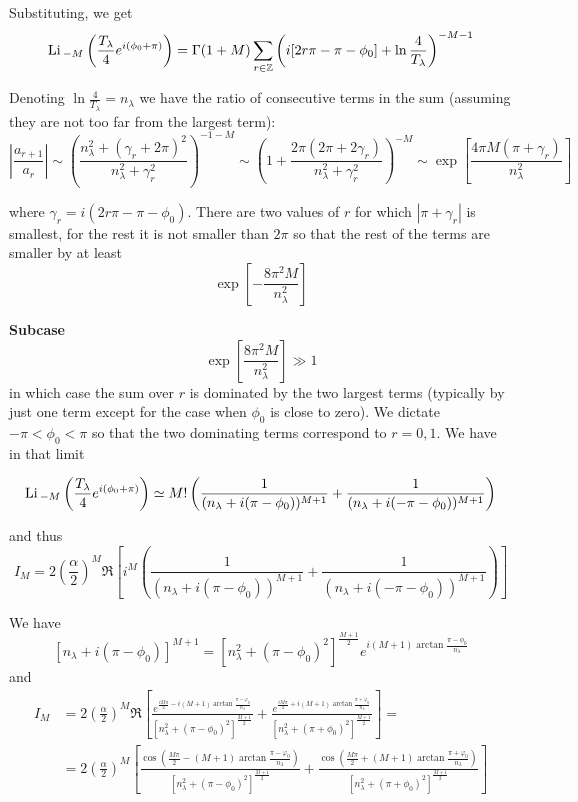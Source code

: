 Substituting, we get
\[
\mathrm{Li}\,_{-M}\left(\frac{T_{\lambda}}{4}e^{i(\phi_{0}+\pi)}\right)=\Gamma(1+M)\sum_{r\in\mathbb{Z}}\left(i[2r\pi-\pi-\phi_{0}]+\ln\frac{4}{T_{\lambda}}\right)^{-M-1}
\]

Denoting $\ln\frac{4}{T_{\lambda}}=n_{\lambda}$ we have the ratio
of consecutive terms in the sum (assuming they are not too far from
the largest term):
\[
\left|\frac{a_{r+1}}{a_{r}}\right|\sim\left(\frac{n_{\lambda}^{2}+(\gamma_{r}+2\pi)^{2}}{n_{\lambda}^{2}+\gamma_{r}^{2}}\right)^{-1-M}\sim\left(1+\frac{2\pi(2\pi+2\gamma_{r})}{n_{\lambda}^{2}+\gamma_{r}^{2}}\right)^{-M}\sim\exp\left[\frac{4\pi M(\pi+\gamma_{r})}{n_{\lambda}^{2}}\right]
\]

where $\gamma_{r}=i(2r\pi-\pi-\phi_{0})$. There are two values of
$r$ for which $|\pi+\gamma_{r}|$ is smallest, for the rest it is
not smaller than $2\pi$ so that the rest of the terms are smaller
by at least 
\[
\exp\left[-\frac{8\pi^{2}M}{n_{\lambda}^{2}}\right]
\]

\textbf{Subcase}
\[
\exp\left[\frac{8\pi^{2}M}{n_{\lambda}^{2}}\right]\gg1
\]
in which case the sum over $r$ is dominated by the two largest terms
(typically by just one term except for the case when $\phi_{0}$ is
close to zero). We dictate $-\pi<\phi_{0}<\pi$ so that the two dominating
terms correspond to $r=0,1$. We have in that limit

\[
\mathrm{Li}\,_{-M}\left(\frac{T_{\lambda}}{4}e^{i(\phi_{0}+\pi)}\right)\simeq M!\left(\frac{1}{(n_{\lambda}+i(\pi-\phi_{0}))^{M+1}}+\frac{1}{(n_{\lambda}+i(-\pi-\phi_{0}))^{M+1}}\right)
\]

and thus 
\[
I_{M}=2\left(\frac{\alpha}{2}\right)^{M}\Re\left[i^{M}\left(\frac{1}{(n_{\lambda}+i(\pi-\phi_{0}))^{M+1}}+\frac{1}{(n_{\lambda}+i(-\pi-\phi_{0}))^{M+1}}\right)\right]
\]

We have 
\[
[n_{\lambda}+i(\pi-\phi_{0})]^{M+1}=\left[n_{\lambda}^{2}+(\pi-\phi_{0})^{2}\right]^{\frac{M+1}{2}}e^{i(M+1)\arctan\frac{\pi-\phi_{0}}{n_{\lambda}}}
\]
and 
\begin{align*}
I_{M} & =2\left(\frac{\alpha}{2}\right)^{M}\Re\left[\frac{e^{\frac{iM\pi}{2}-i(M+1)\arctan\frac{\pi-\varphi_{0}}{n_{\lambda}}}}{\left[n_{\lambda}^{2}+(\pi-\phi_{0})^{2}\right]^{\frac{M+1}{2}}}+\frac{e^{\frac{iM\pi}{2}+i(M+1)\arctan\frac{\pi+\varphi_{0}}{n_{\lambda}}}}{\left[n_{\lambda}^{2}+(\pi+\phi_{0})^{2}\right]^{\frac{M+1}{2}}}\right]=\\
& =2\left(\frac{\alpha}{2}\right)^{M}\left[\frac{\cos\left(\frac{M\pi}{2}-(M+1)\arctan\frac{\pi-\varphi_{0}}{n_{\lambda}}\right)}{\left[n_{\lambda}^{2}+(\pi-\phi_{0})^{2}\right]^{\frac{M+1}{2}}}+\frac{\cos\left(\frac{M\pi}{2}+(M+1)\arctan\frac{\pi+\varphi_{0}}{n_{\lambda}}\right)}{\left[n_{\lambda}^{2}+(\pi+\phi_{0})^{2}\right]^{\frac{M+1}{2}}}\right]
\end{align*}

